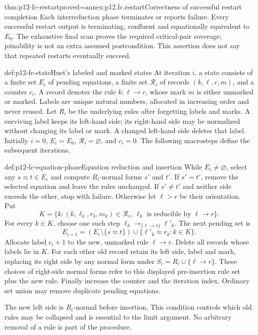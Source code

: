 \begin{hbtheorem}{thm:p12-fc-restart}{proved=annex:p12.fc.restart}{Correctness of successful restart completion}
Each interreduction phase terminates or reports failure. Every
successful restart output is terminating, confluent and equationally
equivalent to \(E_0\). The exhaustive final scan proves the required
critical-pair coverage; joinability is not an extra assumed postcondition.
This assertion does not say that repeated restarts eventually succeed.
\end{hbtheorem}

\begin{hbdefinition}{def:p12-fc-state}{Huet's labeled and marked states}
At iteration \(i\), a state consists of a finite set \(E_i\) of
pending equations, a finite set \(\mathcal R_i\) of records
\((k,\ell,r,m)\), and a counter \(c_i\). A record denotes the
rule \(k:\ell\to r\), whose mark \(m\) is either unmarked or
marked. Labels are unique natural numbers, allocated in increasing
order and never reused. Let \(R_i\) be the underlying rules after
forgetting labels and marks. A surviving label keeps its left-hand
side; its right-hand side may be normalized without changing its
label or mark. A changed left-hand side deletes that label.
Initially \(i=0\), \(E_i=E_0\),
\(\mathcal R_i=\varnothing\), and \(c_i=0\).
The following macrosteps define the subsequent iterations.
\end{hbdefinition}

\begin{hbmethod}{def:p12-fc-equation-phase}{Equation reduction and insertion}
While \(E_i\ne\varnothing\), select any \(s\approx t\in E_i\)
and compute \(R_i\)-normal forms \(s'\) and \(t'\).
If \(s'=t'\), remove the selected equation and leave the rules
unchanged. If \(s'\ne t'\) and neither side exceeds the other,
stop with failure. Otherwise let \(\ell>r\) be their orientation.
Put
\[
 K=\{k:(k,\ell_k,r_k,m_k)\in\mathcal R_i,
                   \ \ell_k\text{ is reducible by }\ell\to r\}.
\]
For every \(k\in K\), choose one such step
\(\ell_k\to_{\{\ell\to r\}}\ell'_k\). The next pending set is
\[
 E_{i+1}=(E_i\setminus\{s\approx t\})
                 \cup\{\ell'_k\approx r_k:k\in K\}.
\]
Allocate label \(c_i+1\) to the new, unmarked rule \(\ell\to r\).
Delete all records whose labels lie in \(K\). For each other old
record retain its left side, label and mark, replacing its right side
by any normal form under \(S_i=R_i\cup\{\ell\to r\}\).
These choices of right-side normal forms refer to this displayed
pre-insertion rule set plus the new rule. Finally increase the counter
and the iteration index. Ordinary set union may remove duplicate
pending equations.

The new left side is \(R_i\)-normal before insertion. This condition
controls which old rules may be collapsed and is essential to the
limit argument. No arbitrary removal of a rule is part of the procedure.
\end{hbmethod}

